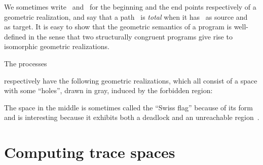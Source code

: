\documentclass[orivec]{llncs} \usepackage[T1]{fontenc}
\newcommand{\comment}[1]{}
\begin{document}
\noindent
We sometimes write~ and~ for the beginning and the end points
respectively of a geometric realization, and say that a path~ is
\emph{total} when it has~ as source and~ as target. It is easy to
show that the geometric semantics of a program is well-defined in the sense that
two structurally congruent programs give rise to isomorphic geometric
realizations.



\begin{example}
The processes

  respectively have the following geometric realizations, which all consist of a
  space with some ``holes'', drawn in gray, induced by the forbidden region:
  
  The space in the middle is sometimes called the ``Swiss flag'' because of its
  form and is interesting because it exhibits both a deadlock and an unreachable
  region~\cite{tcs}.
\end{example}

\comment{
The fact that the definition of the geometric semantics resembles a lot the
trace semantics introduced in Section~\ref{sec:ts} can be explained by the fact
that it is in fact a ``geometrization'' of the trace semantics. Namely, if we
see a vertex as a point, an edge as a directed segment~, an independence
tile as a directed square~, and glue these topological spaces
according to how they are connected in the asynchronous graphs, then we recover
a subset of the geometric semantics (this process can be formally expressed
category using a coend): this process is called the \emph{geometric realization}
of a cubical set.
In particular, this implies that the schedulings in trace and geometric semantics
are essentially the same:
\begin{proposition}
  Given a program~, there is a (well-behaved) injection~ from the set
  of total paths of the trace semantics of~ to the set of total paths of the
  geometric semantics of~. Moreover, every total path in the geometric
  semantics is dihomotopic to a total path in the image of~; and two
  total paths in the trace semantics are dihomotopic if and only if their images
  under~ are dihomotopic.
\end{proposition}
The notion of dihomotopy in geometric semantics is formally introduced in
Definition~\ref{def:dihomotopy} below. We call any total path in the image
of~, dihomotopic to~ in the geometric semantics, a \emph{lifting}
of~.
}

\section{Computing trace spaces}
\label{computing}
\end{document}
